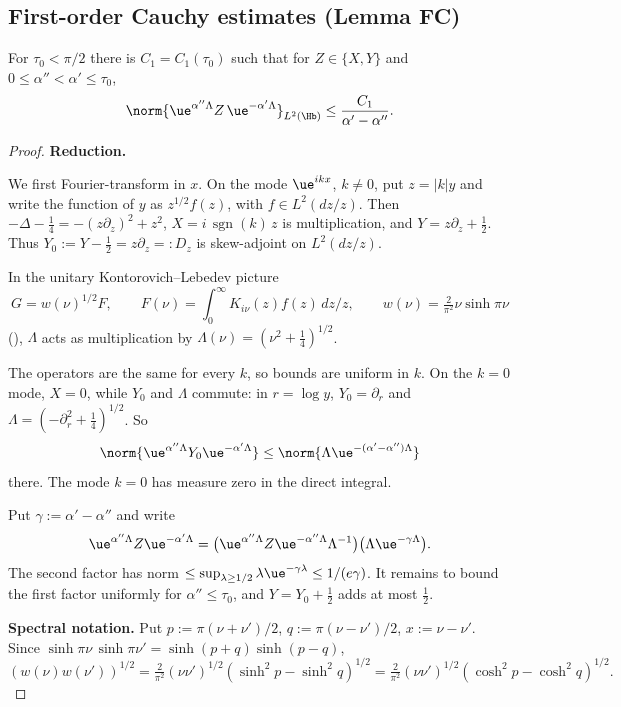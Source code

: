 \subsection{First-order Cauchy estimates (Lemma FC)}\label{subsec:dd-fc}

\begin{lemma}[FC]\label{lem:fc}
For $\tau_0<\pi/2$ there is $C_1=C_1(\tau_0)$ such that for $Z\in\{X,Y\}$ and $0\le\alpha''<\alpha'\le\tau_0$,
\[
\norm{\ue^{\alpha''\Lambda}Z\,\ue^{-\alpha'\Lambda}}_{L^2(\Hb)}\le\frac{C_1}{\alpha'-\alpha''}.
\]
\end{lemma}

\begin{proof}
\medskip\noindent\textbf{Reduction.}

We first Fourier-transform in $x$. On the mode $\ue^{ikx}$, $k\ne0$, put $z=|k|y$ and write the function of $y$
as $z^{1/2}f(z)$, with $f\in L^2(dz/z)$. Then $-\Delta-\tfrac14=-(z\partial_z)^2+z^2$,
$X=i\,\operatorname{sgn}(k)\,z$ is multiplication, and $Y=z\partial_z+\tfrac12$.
Thus $Y_0:=Y-\tfrac12=z\partial_z=:D_z$ is skew-adjoint on $L^2(dz/z)$.

In the unitary Kontorovich--Lebedev picture
\[G=w(\nu)^{1/2}F,\qquad F(\nu)=\int_0^\infty K_{i\nu}(z)f(z)\,dz/z,\qquad w(\nu)=\tfrac{2}{\pi^2}\nu\sinh\pi\nu\]
(\cite{Y}), $\Lambda$ acts as multiplication by $\Lambda(\nu)=(\nu^2+\tfrac14)^{1/2}$.

The operators are the same for every $k$, so bounds are uniform in $k$. On the $k=0$ mode, $X=0$, while $Y_0$ and $\Lambda$ commute: in $r=\log y$, $Y_0=\partial_r$ and $\Lambda=(-\partial_r^2+\tfrac14)^{1/2}$. So
\[\norm{\ue^{\alpha''\Lambda}Y_0\ue^{-\alpha'\Lambda}}\le\norm{\Lambda\ue^{-(\alpha'-\alpha'')\Lambda}}\]
there. The mode $k=0$ has measure zero in the direct integral.

Put $\gamma:=\alpha'-\alpha''$ and write
\[
\ue^{\alpha''\Lambda}Z\ue^{-\alpha'\Lambda}=\bigl(\ue^{\alpha''\Lambda}Z\ue^{-\alpha''\Lambda}\Lambda^{-1}\bigr)\bigl(\Lambda\ue^{-\gamma\Lambda}\bigr).
\]
The second factor has norm $\le\sup_{\lambda\ge1/2}\lambda\ue^{-\gamma\lambda}\le1/(e\gamma)$. It remains to bound the first factor uniformly for $\alpha''\le\tau_0$, and $Y=Y_0+\tfrac12$ adds at most $\tfrac12$.

\medskip\noindent\textbf{Spectral notation.} Put $p:=\pi(\nu+\nu')/2$, $q:=\pi(\nu-\nu')/2$, $x:=\nu-\nu'$. Since $\sinh\pi\nu\,\sinh\pi\nu'=\sinh(p+q)\sinh(p-q)$,
\[
(w(\nu)w(\nu'))^{1/2}=\tfrac{2}{\pi^2}(\nu\nu')^{1/2}(\sinh^2p-\sinh^2q)^{1/2}=\tfrac{2}{\pi^2}(\nu\nu')^{1/2}(\cosh^2p-\cosh^2q)^{1/2}.
\]


\end{proof}

